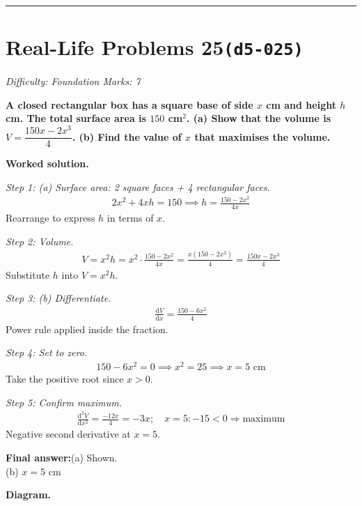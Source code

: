 \documentclass[11pt]{article}
\newcommand{\question}[1]{\par\medskip\noindent\textbf{#1}\par}
\begin{document}
\medskip\hrule

\section*{Real-Life Problems 25\quad\small\texttt{(d5-025)}}
\textit{Difficulty: Foundation \quad\textbar\quad Marks: 7}

\question{A closed rectangular box has a square base of side \( x \) cm and height \( h \) cm. The total surface area is \( 150 \) cm\(^2\). (a) Show that the volume is \( V = \dfrac{150x - 2x^3}{4} \). (b) Find the value of \( x \) that maximises the volume.}

\textbf{Worked solution.}

\textit{Step 1: (a) Surface area: 2 square faces + 4 rectangular faces.}
\[\begin{gathered}
2x^2 + 4xh = 150 \implies h = \frac{150 - 2x^2}{4x}
\end{gathered}\]
Rearrange to express \( h \) in terms of \( x \).

\textit{Step 2: Volume.}
\[\begin{gathered}
V = x^2 h = x^2 \cdot \frac{150 - 2x^2}{4x} = \frac{x(150 - 2x^2)}{4} = \frac{150x - 2x^3}{4}
\end{gathered}\]
Substitute \( h \) into \( V = x^2 h \).

\textit{Step 3: (b) Differentiate.}
\[\begin{gathered}
\frac{\mathrm{d}V}{\mathrm{d}x} = \frac{150 - 6x^2}{4}
\end{gathered}\]
Power rule applied inside the fraction.

\textit{Step 4: Set to zero.}
\[\begin{gathered}
150 - 6x^2 = 0 \implies x^2 = 25 \implies x = 5 \text{ cm}
\end{gathered}\]
Take the positive root since \( x > 0 \).

\textit{Step 5: Confirm maximum.}
\[\begin{gathered}
\frac{\mathrm{d}^2V}{\mathrm{d}x^2} = \frac{-12x}{4} = -3x; \quad x=5: -15 < 0 \Rightarrow \text{maximum}
\end{gathered}\]
Negative second derivative at \( x = 5 \).

\begin{answerbox}
\textbf{Final answer:}\quad (a) Shown. \\[3pt]  (b) \(\displaystyle  x = 5 \) cm
\end{answerbox}
\textbf{Diagram.}
\end{document}
